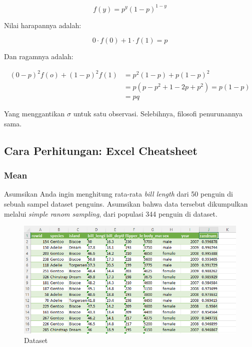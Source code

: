 \documentclass[
  letterpaper,
  DIV=11,
  numbers=noendperiod]{scrreprt}
\begin{document}
\[
f(y)=p^{y}(1-p)^{1-y}
\]

Nilai harapannya adalah:

\[
0\cdot f(0)+1\cdot f(1)=p
\]

Dan ragamnya adalah:

\[
\begin{aligned}
(0-p)^2 f(o)+(1-p)^2f(1)&=p^2(1-p)+p(1-p)^2\\ 
&=p(p-p^2+1-2p+p^2)=p(1-p)\\ 
&=pq
\end{aligned}
\]

Yang menggantikan \(\sigma\) untuk satu observasi. Selebihnya, filosofi
penurunannya sama.

\hypertarget{cara-perhitungan-excel-cheatsheet}{%
\subsection{Cara Perhitungan: Excel
Cheatsheet}\label{cara-perhitungan-excel-cheatsheet}}

\hypertarget{mean-1}{%
\subsubsection{Mean}\label{mean-1}}

Asumsikan Anda ingin menghitung rata-rata \emph{bill length} dari 50
penguin di sebuah sampel dataset penguins. Asumsikan bahwa data tersebut
dikumpulkan melalui \emph{simple ranom sampling}, dari populasi 344
penguin di dataset.

\begin{figure}

{\centering \includegraphics{./count-1.png}

}

\caption{Dataset}

\end{figure}
\end{document}
